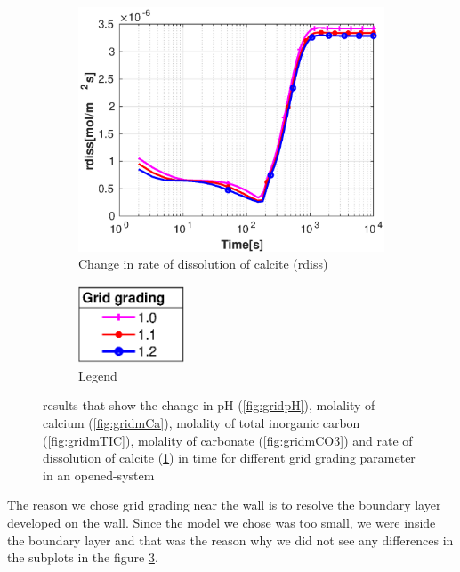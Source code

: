 \begin{figure}[!h]
        \hfill
        \begin{subfigure}{.5\linewidth}
            \centering
        \includegraphics[width=\textwidth]{PICTURES/with_grid_rdiss.eps}
        \caption{Change in rate of dissolution of calcite (rdiss)}
        \label{fig:gridrdiss}
    \end{subfigure}%
        \hfill
        \begin{subfigure}{.5\linewidth}
            \centering
        \includegraphics[width=0.35\textwidth]{PICTURES/with_grid_legend.eps}
        \caption{Legend}
        \label{fig:gridlegend}
    \end{subfigure}%
    \caption{\DuMuX results that show the change in pH (\cref{fig:gridpH}), molality of calcium (\cref{fig:gridmCa}), 
    molality of total inorganic carbon (\cref{fig:gridmTIC}), molality of carbonate (\cref{fig:gridmCO3}) 
    and rate of dissolution of calcite (\cref{fig:gridrdiss}) in time for different grid grading parameter in an opened-system}
    \label{fig:diffGrid}
\end{figure}

The reason we chose grid grading near the wall is to resolve the boundary layer developed on the wall. Since the model we chose was too small, we were inside the boundary layer and that was the reason why we did not see any differences in the subplots in the figure \ref{fig:diffGrid}.

